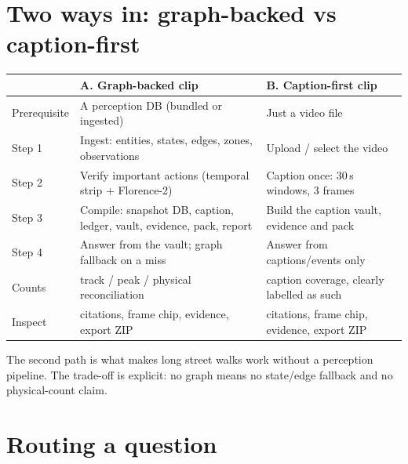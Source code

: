 \documentclass[10pt,a4paper]{article}
\begin{document}
\section{Two ways in: graph-backed vs caption-first}

\begin{center}
\small
\begin{tabularx}{\linewidth}{@{}l L L@{}}
\toprule
 & \textbf{A. Graph-backed clip} & \textbf{B. Caption-first clip} \\
\midrule
Prerequisite & A perception DB (bundled or ingested) & Just a video file \\
Step 1 & Ingest: entities, states, edges, zones, observations & Upload / select the video \\
Step 2 & Verify important actions (temporal strip + Florence-2) & Caption once: 30\,s windows, 3 frames \\
Step 3 & Compile: snapshot DB, caption, ledger, vault, evidence, pack, report & Build the caption vault, evidence and pack \\
Step 4 & Answer from the vault; graph fallback on a miss & Answer from captions/events only \\
Counts & track / peak / physical reconciliation & caption coverage, clearly labelled as such \\
Inspect & citations, frame chip, evidence, export ZIP & citations, frame chip, evidence, export ZIP \\
\bottomrule
\end{tabularx}
\end{center}

\noindent
The second path is what makes long street walks work without a perception pipeline. The trade-off is
explicit: no graph means no state/edge fallback and no physical-count claim.

\section{Routing a question}
\end{document}

